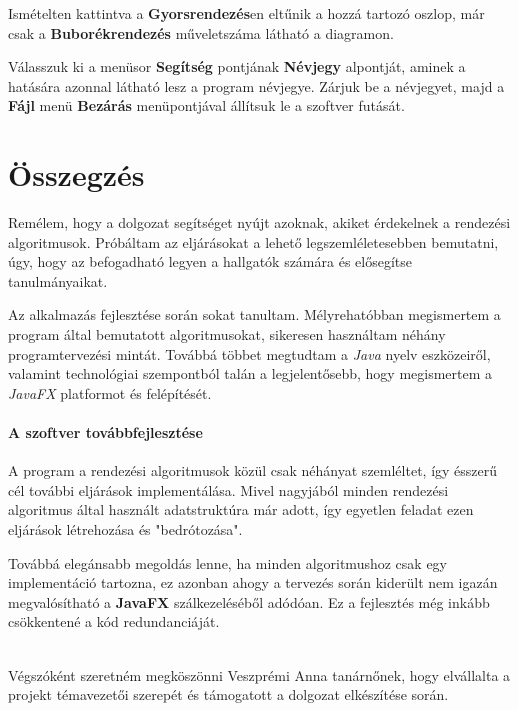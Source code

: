 \documentclass{elteikthesis}
\newcommand{\hiddensubsubsection}[1]{
	\stepcounter{subsubsection}
	\subsubsection*{{#1}}	
}
\begin{document}
Ismételten kattintva a \textbf{Gyorsrendezés}en eltűnik a hozzá tartozó oszlop, már csak a \textbf{Buborékrendezés} műveletszáma látható a diagramon.\par
Válasszuk ki a menüsor \textbf{Segítség} pontjának \textbf{Névjegy} alpontját, aminek a hatására azonnal látható lesz a program névjegye. Zárjuk be a névjegyet, majd a \textbf{Fájl} menü \textbf{Bezárás} menüpontjával állítsuk le a szoftver futását.
\chapter{Összegzés}
Remélem, hogy a dolgozat segítséget nyújt azoknak, akiket érdekelnek a rendezési algoritmusok. Próbáltam az eljárásokat a lehető legszemléletesebben bemutatni, úgy, hogy az befogadható legyen a hallgatók számára és elősegítse tanulmányaikat.\par
Az alkalmazás fejlesztése során sokat tanultam. Mélyrehatóbban megismertem a program által bemutatott algoritmusokat, sikeresen használtam néhány programtervezési mintát. Továbbá többet megtudtam a \emph{Java} nyelv eszközeiről, valamint technológiai szempontból talán a legjelentősebb, hogy megismertem a \emph{JavaFX} platformot és felépítését.\par
\hiddensubsubsection{A szoftver továbbfejlesztése}
A program a rendezési algoritmusok közül csak néhányat szemléltet, így ésszerű cél további eljárások implementálása. Mivel nagyjából minden rendezési algoritmus által használt adatstruktúra már adott, így egyetlen feladat ezen eljárások létrehozása és "bedrótozása".\par
Továbbá elegánsabb megoldás lenne, ha minden algoritmushoz csak egy implementáció tartozna, ez azonban ahogy a tervezés során kiderült nem igazán megvalósítható a \textbf{JavaFX} szálkezeléséből adódóan. Ez a fejlesztés még inkább csökkentené a kód redundanciáját.
\\
\\
\par
Végszóként szeretném megköszönni Veszprémi Anna tanárnőnek, hogy elvállalta a projekt témavezetői szerepét és támogatott a dolgozat elkészítése során.
\end{document}
